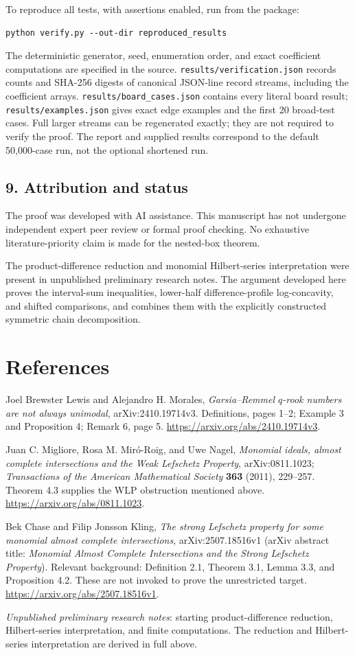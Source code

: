 \documentclass[11pt]{article}
\begin{document}
To reproduce all tests, with assertions enabled, run from the package:
\begin{verbatim}
python verify.py --out-dir reproduced_results
\end{verbatim}
The deterministic generator, seed, enumeration order, and exact
coefficient computations are specified in the source.
\texttt{results/verification.json} records counts and SHA-256 digests of
canonical JSON-line record streams, including the coefficient arrays.
\texttt{results/board\_cases.json} contains every literal board result;
\texttt{results/examples.json} gives exact edge examples and the first
20 broad-test cases. Full larger streams can be regenerated exactly;
they are not required to verify the proof. The report and supplied
results correspond to the default 50,000-case run, not the optional
shortened run.

\subsection*{9. Attribution and status}
The proof was developed with AI assistance. This manuscript has not undergone
independent expert peer review or formal proof checking. No exhaustive
literature-priority claim is made for the nested-box theorem.

The product-difference reduction and monomial Hilbert-series interpretation
were present in unpublished preliminary research notes. The argument developed
here proves the interval-sum inequalities, lower-half difference-profile
log-concavity, and shifted comparisons, and combines them with the explicitly
constructed symmetric chain decomposition.

\section*{References}
\noindent
Joel Brewster Lewis and Alejandro H. Morales,
\emph{Garsia--Remmel $q$-rook numbers are not always unimodal},
arXiv:2410.19714v3. Definitions, pages 1--2; Example 3 and Proposition 4;
Remark 6, page 5.
\url{https://arxiv.org/abs/2410.19714v3}.

\noindent
Juan C. Migliore, Rosa M. Mir\'o-Roig, and Uwe Nagel,
\emph{Monomial ideals, almost complete intersections and the Weak
Lefschetz Property}, arXiv:0811.1023; \emph{Transactions of the American
Mathematical Society} \textbf{363} (2011), 229--257.
Theorem 4.3 supplies the WLP obstruction mentioned above.
\url{https://arxiv.org/abs/0811.1023}.

\noindent
Bek Chase and Filip Jonsson Kling,
\emph{The strong Lefschetz property for some monomial almost complete
intersections}, arXiv:2507.18516v1 (arXiv abstract title:
\emph{Monomial Almost Complete Intersections and the Strong Lefschetz
Property}). Relevant background: Definition 2.1, Theorem 3.1, Lemma 3.3,
and Proposition 4.2. These are not invoked to prove the unrestricted
target.
\url{https://arxiv.org/abs/2507.18516v1}.

\noindent
\emph{Unpublished preliminary research notes}: starting product-difference
reduction, Hilbert-series interpretation, and finite computations.
The reduction and Hilbert-series interpretation are derived in full above.
\end{document}
